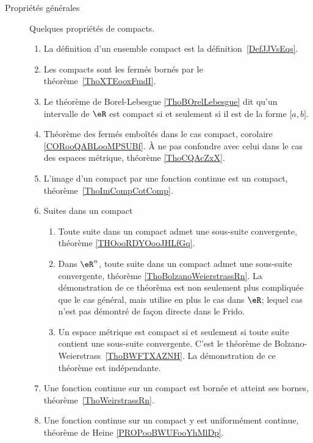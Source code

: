         \label{THEMEooQQBHooLcqoKB}
    \begin{description}

        \item[Propriétés générales]

            Quelques propriétés de compacts.

                \begin{enumerate}
    \item
        La définition d'un ensemble compact est la définition~\ref{DefJJVsEqs}.
    \item
        Les compacts sont les fermés bornés par le théorème~\ref{ThoXTEooxFmdI}.
    \item
        Le théorème de Borel-Lebesgue \ref{ThoBOrelLebesgue} dit qu'un intervalle de \( \eR\) est compact si et seulement si il est de la forme \( \mathopen[ a , b \mathclose]\).
    \item
        Théorème des fermés emboîtés dans le cas compact, corolaire \ref{CORooQABLooMPSUBf}. À ne pas confondre avec celui dans le cas des espaces métrique, théorème \ref{ThoCQAcZxX}.
    \item
        L'image d'un compact par une fonction continue est un compact, théorème~\ref{ThoImCompCotComp}.
    \item
        Suites dans un compact
        \begin{enumerate}
            \item
                Toute suite dans un compact admet une sous-suite convergente, théorème \ref{THOooRDYOooJHLfGq}.
            \item
                Dans \( \eR^n\), toute suite dans un compact admet une sous-suite convergente, théorème \ref{ThoBolzanoWeierstrassRn}. La démonstration de ce théorèma est non seulement plus compliquée que le cas général, mais utilise en plus le cas dans \( \eR\); lequel cas n'est pas démontré de façon directe dans le Frido.
            \item
                Un espace métrique est compact si et seulement si toute suite contient une sous-suite convergente. C'est le théorème de Bolzano-Weierstrass~\ref{ThoBWFTXAZNH}. La démonstration de ce théorème est indépendante.
        \end{enumerate}
    \item
        Une fonction continue sur un compact est bornée et atteint ses bornes, théorème~\ref{ThoWeirstrassRn}.
    \item
        Une fonction continue sur un compact y est uniformément continue, théorème de Heine \ref{PROPooBWUFooYhMlDp}.
                \end{enumerate}


\end{description}
